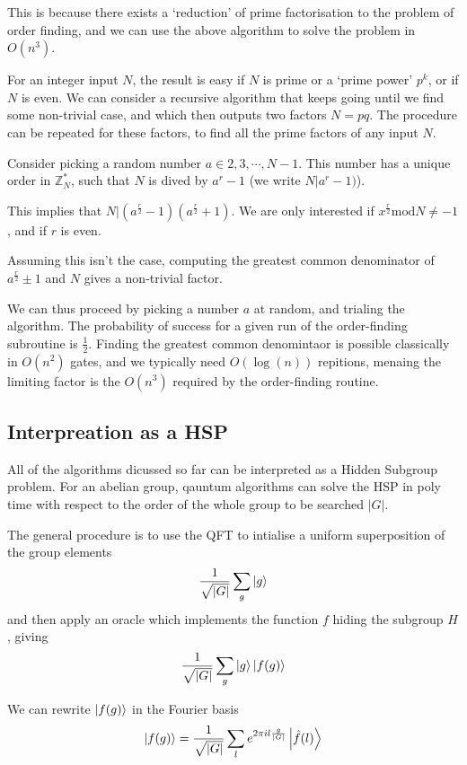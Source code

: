 \documentclass[11pt]{article}
\begin{document}
This is because there exists a `reduction' of prime factorisation to the problem of order finding, and we can use the above algorithm to solve the problem in $O(n^{3})$.

For an integer input $N$, the result is easy if $N$ is prime or a `prime power' $p^{k}$, or if $N$ is even. We can consider a recursive algorithm that keeps going until we find some non-trivial case, and which then outputs two factors $N=pq$.
The procedure can be repeated for these factors, to find all the prime factors of any input $N$.

Consider picking a random number $a\in{2,3,\cdots ,N-1}$. This number has a unique order in $\mathbb{Z}_{N}^{*}$, such that $N$ is dived by $a^{r}-1$ (we write $N\vert a^{r}-1)$).

This implies that $N\vert(a^{\frac{r}{2}}-1)(a^{\frac{r}{2}}+1)$. We are only interested if $x^{\frac{r}{2}}\text{mod} N\neq -1$, and if $r$ is even.

Assuming this isn't the case, computing the greatest common denominator of $a^{\frac{r}{2}}\pm1$ and $N$ gives a non-trivial factor.

We can thus proceed by picking a number $a$ at random, and trialing the algorithm. The probability of success for a given run of the order-finding subroutine is $\frac{1}{2}$. Finding the greatest common denomintaor is possible classically in $O(n^{2})$ gates, and we typically need $O(\log(n))$ repitions, menaing the limiting factor is the $O(n^{3})$ required by the order-finding routine.

\subsection*{Interpreation as a HSP}
All of the algorithms dicussed so far can be interpreted as a Hidden Subgroup problem. For an abelian group, qauntum algorithms can solve the HSP in poly time with respect to the order of the whole group to be searched $\vert G\vert$.

The general procedure is to use the QFT to intialise a uniform superposition of the group elements
\[\frac{1}{\sqrt{\vert G \vert}}\sum_{g}\ket{g}\]
and then apply an oracle which implements the function $f$ hiding the subgroup $H$, giving
\[\frac{1}{\sqrt{\vert G \vert}}\sum_{g}\ket{g}\ket{f(g)}\]

We can rewrite $\ket{f(g)}$ in the Fourier basis
\[\ket{f(g)}=\frac{1}{\sqrt{\vert G \vert}}\sum_{l}
e^{2\pi i l \frac{g}{\vert G\vert}}\ket{\hat{f}(l)}
\]
\end{document}
